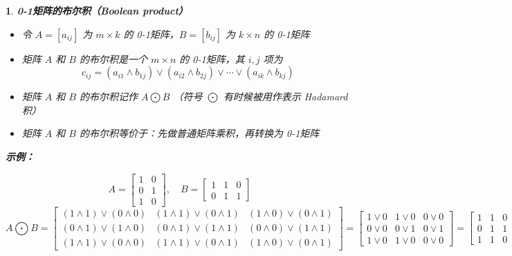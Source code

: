 \documentclass[UTF8]{report}
\theoremstyle{MyLineTheoremStyle} %
\theoremstyle{MyBlockTheoremStyle} %
\theoremstyle{MySubsubsectionStyle} %
\newtheorem{definition}{}
\begin{document}
\begin{definition}
        \textbf{0-1矩阵的布尔积（Boolean product）}\par
        \begin{itemize}
            \item 令 $A = [a_{ij}]$ 为 $m \times k$ 的 0-1矩阵，$B = [b_{ij}]$ 为 $k \times n$ 的 0-1矩阵
            \item 矩阵 $A$ 和 $B$ 的布尔积是一个 $m \times n$ 的 0-1矩阵，其 $i,j$ 项为
            \[
            c_{ij} = (a_{i1} \land b_{1j}) \lor (a_{i2} \land b_{2j}) \lor \cdots \lor (a_{ik} \land b_{kj})
            \]
            \item 矩阵 $A$ 和 $B$ 的布尔积记作 $A \bigodot  B$ （符号 $\bigodot $ 有时候被用作表示 Hadamard积）
            \item 矩阵 $A$ 和 $B$ 的布尔积等价于：先做普通矩阵乘积，再转换为 0-1矩阵
        \end{itemize}
    
        \textbf{示例：}\par
        \[
        A =
        \begin{bmatrix}
        1 & 0 \\
        0 & 1 \\
        1 & 0
        \end{bmatrix}
        , \quad
        B =
        \begin{bmatrix}
        1 & 1 & 0 \\
        0 & 1 & 1
        \end{bmatrix}
        \]
        \[
        A \bigodot  B =
        \begin{bmatrix}
        (1 \land 1) \lor (0 \land 0) & (1 \land 1) \lor (0 \land 1) & (1 \land 0) \lor (0 \land 1) \\
        (0 \land 1) \lor (1 \land 0) & (0 \land 1) \lor (1 \land 1) & (0 \land 0) \lor (1 \land 1) \\
        (1 \land 1) \lor (0 \land 0) & (1 \land 1) \lor (0 \land 1) & (1 \land 0) \lor (0 \land 1)
        \end{bmatrix}
        =
        \begin{bmatrix}
        1 \lor 0 & 1 \lor 0 & 0 \lor 0 \\
        0 \lor 0 & 0 \lor 1 & 0 \lor 1 \\
        1 \lor 0 & 1 \lor 0 & 0 \lor 0
        \end{bmatrix}
        =
        \begin{bmatrix}
            1 & 1 & 0 \\
            0 & 1 & 1 \\
            1 & 1 & 0
            \end{bmatrix}
            \]


\end{definition}
\end{document}
